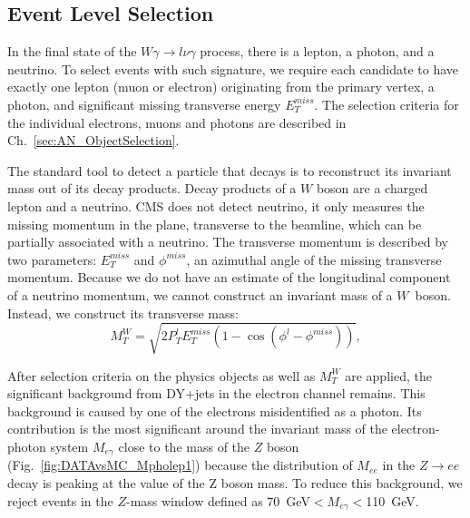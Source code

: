 \subsection{Event Level Selection}
\label{sec:AN_Selection_EventLevel}

In the final state of the $W\gamma\rightarrow l\nu\gamma$ process, there is a lepton, a photon, and a neutrino. To select events with such signature, we require each candidate to have exactly one lepton (muon or electron) originating from the primary vertex, a photon, and significant missing transverse energy $E_T^{miss}$. The selection criteria for the individual electrons, muons and photons are described in Ch.~\ref{sec:AN_ObjectSelection}.

The standard tool to detect a particle that decays is to reconstruct its invariant mass out of its decay products. Decay products of a $W$ boson are a charged lepton and a neutrino. CMS does not detect neutrino, it only measures the missing momentum in the plane, transverse to the beamline, which can be partially associated with a neutrino. The transverse momentum is described by two parameters: $E_T^{miss}$ and $\phi^{miss}$, an azimuthal angle of the missing transverse momentum. Because we do not have an estimate of the longitudinal component of a neutrino momentum, we cannot construct an invariant mass of a $W$~boson. Instead, we construct its transverse mass:
\begin{equation}
M_T^W=\sqrt{2  P_T^{l}  E_T^{miss}  (1-\cos{(\phi^{l}-\phi^{miss})})},
\end{equation}

After selection criteria on the physics objects as well as $M_T^W$ are applied, the significant background from DY+jets in the electron channel remains. This background is caused by one of the electrons misidentified as a photon. Its contribution is the most significant around the invariant mass of the electron-photon system $M_{e\gamma}$ close to the mass of the $Z$ boson (Fig.~\ref{fig:DATAvsMC_Mpholep1}) because the distribution of $M_{ee}$ in the $Z\rightarrow e e$ decay is peaking at the value of the Z boson mass. To reduce this background, we reject events in the $Z$-mass window defined as 70~GeV$<M_{e\gamma}<$110~GeV. 

